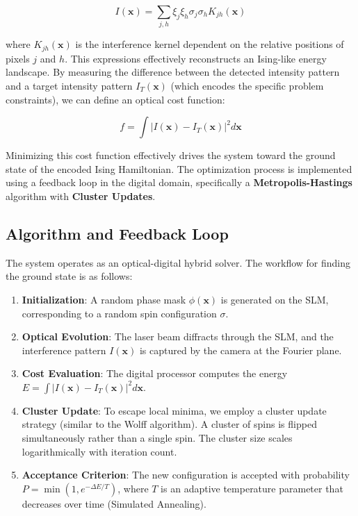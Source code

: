 \begin{equation}
I(\mathbf{x}) = \sum_{j,h} \xi_j \xi_h \sigma_j \sigma_h K_{jh}(\mathbf{x})
\end{equation}

where $K_{jh}(\mathbf{x})$ is the interference kernel dependent on the relative positions of pixels $j$ and $h$. This expressions effectively reconstructs an Ising-like energy landscape. By measuring the difference between the detected intensity pattern and a target intensity pattern $I_T(\mathbf{x})$ (which encodes the specific problem constraints), we can define an optical cost function:

\begin{equation}
f = \int |I(\mathbf{x}) - I_T(\mathbf{x})|^2 d\mathbf{x}
\end{equation}

Minimizing this cost function effectively drives the system toward the ground state of the encoded Ising Hamiltonian. The optimization process is implemented using a feedback loop in the digital domain, specifically a \textbf{Metropolis-Hastings} algorithm with \textbf{Cluster Updates}.

\subsection{Algorithm and Feedback Loop}
The system operates as an optical-digital hybrid solver. The workflow for finding the ground state is as follows:

\begin{enumerate}
    \item \textbf{Initialization}: A random phase mask $\phi(\mathbf{x})$ is generated on the SLM, corresponding to a random spin configuration $\sigma$.
    \item \textbf{Optical Evolution}: The laser beam diffracts through the SLM, and the interference pattern $I(\mathbf{x})$ is captured by the camera at the Fourier plane.
    \item \textbf{Cost Evaluation}: The digital processor computes the energy $E = \int |I(\mathbf{x}) - I_T(\mathbf{x})|^2 d\mathbf{x}$.
    \item \textbf{Cluster Update}: To escape local minima, we employ a cluster update strategy (similar to the Wolff algorithm). A cluster of spins is flipped simultaneously rather than a single spin. The cluster size scales logarithmically with iteration count.
    \item \textbf{Acceptance Criterion}: The new configuration is accepted with probability $P = \min(1, e^{-\Delta E / T})$, where $T$ is an adaptive temperature parameter that decreases over time (Simulated Annealing).
\end{enumerate}

